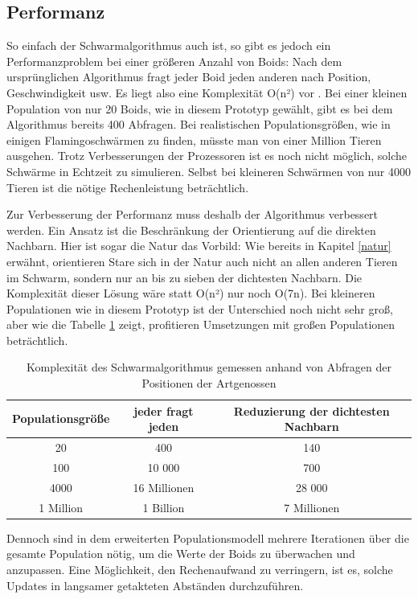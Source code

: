 \documentclass[draft=false
              ,paper=a4
              ,twoside=false
              ,fontsize=11pt
              ,headsepline
              ,BCOR10mm
              ,DIV11
              ,bibtotoc
              ,liststotoc
              ]{scrbook}
\begin{document}
\subsection{Performanz}\label{lahm}
So einfach der Schwarmalgorithmus auch ist, so gibt es jedoch ein Performanzproblem bei einer größeren Anzahl von Boids: Nach dem ursprünglichen Algorithmus fragt jeder Boid jeden anderen nach Position, Geschwindigkeit usw. Es liegt also eine Komplexität O(n²) vor \cite{reynolds87}. Bei einer kleinen Population von nur 20 Boids, wie in diesem Prototyp gewählt, gibt es bei dem Algorithmus bereits 400 Abfragen. Bei realistischen Populationsgrößen, wie in einigen Flamingoschwärmen zu finden, müsste man von einer Million Tieren ausgehen. Trotz Verbesserungen der Prozessoren ist es noch nicht möglich, solche Schwärme in Echtzeit zu simulieren. Selbst bei kleineren Schwärmen von nur 4000 Tieren ist die nötige Rechenleistung beträchtlich.

Zur Verbesserung der Performanz muss deshalb der Algorithmus verbessert werden. Ein Ansatz ist die Beschränkung der Orientierung auf die direkten Nachbarn. Hier ist sogar die Natur das Vorbild: Wie bereits in Kapitel \ref{natur} erwähnt, orientieren Stare sich in der Natur auch nicht an allen anderen Tieren im Schwarm, sondern nur an bis zu sieben der dichtesten Nachbarn. Die Komplexität dieser Lösung wäre statt O(n²) nur noch O(7n). Bei kleineren Populationen wie in diesem Prototyp ist der Unterschied noch nicht sehr groß, aber wie die Tabelle \ref{komplexitaet} zeigt, profitieren Umsetzungen mit großen Populationen beträchtlich.

\begin{table}[h]
\centering
\begin{tabular}{c|c|c}
	Populationsgröße & jeder fragt jeden & Reduzierung der dichtesten Nachbarn\\
	\hline
	20 & 400 & 140\\
	100 & 10 000 & 700\\
	4000 & 16 Millionen & 28 000\\
	1 Million & 1 Billion & 7 Millionen\\
\end{tabular}
\caption{Komplexität des Schwarmalgorithmus gemessen anhand von Abfragen der Positionen der Artgenossen}
\label{komplexitaet}
\end{table}

Dennoch sind in dem erweiterten Populationsmodell mehrere Iterationen über die gesamte Population nötig, um die Werte der Boids zu überwachen und anzupassen. Eine Möglichkeit, den Rechenaufwand zu verringern, ist es, solche Updates in langsamer getakteten Abständen durchzuführen.
\end{document}

